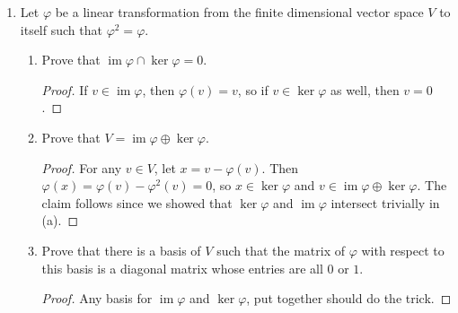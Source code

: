 \documentclass{report}
\newcommand{\R}{\mathbb{R}}
\DeclareMathOperator{\im}{im}
\begin{document}
\begin{enumerate}
\begin{proof}
			If $\varphi|_W$ and $\Tilde{\varphi}$ are nonsingular, then they have inverses $\varphi|^{-1}_W$ and $\Tilde{\varphi}^{-1}$.
			Let $\bar{\varphi}:V\to V$ be defined by $\bar{\varphi}(x+w)=\Tilde{\varphi}^{-1}(x)+\varphi|_W^{-1}(w)$ for any $w\in W$ and $x\in V / W$.
			Then for any $x\in V$, and $w\in W$, 
			$$\bar{\varphi}\circ\varphi (x+w)= \bar{\varphi}(\Tilde{\varphi}(x)+\varphi|_W(x))=x+w$$
			so $\bar{\varphi}$ is an inverse for $\varphi$.
			When $V$ is finite-dimensional, nonsingularity is equivalent to invertibility, so $\varphi^{-1}$ can be split as described above, 
			giving rise to inverses for $\Tilde{\varphi}$ and $\varphi|_W$. However, if $V$ is infinite dimensional, $\varphi$ may not be invertible.
			For example, consider the infinite dimensional vector space $\R[x]$ and the map $\varphi:p(x)\mapsto xp (x)$.
			Observe that $\varphi$ is nonsingular and stabilizes $x\R[x]$. However, in this case $\Tilde{\varphi}:\R\to \R$ is the $0$ map.
		\end{proof}
	\setcounter{enumi}{10}
	\item Let $\varphi$ be a linear transformation from the finite dimensional vector space $V$ to itself such that $\varphi^2=\varphi$.
		\begin{enumerate} [label=(\alph*)]
			\item Prove that $\im \varphi \cap \ker \varphi = 0$.
				\begin{proof}
					If $v\in \im\varphi$, then $\varphi(v)=v$, so if $v\in\ker\varphi$ as well, then $v=0$.
				\end{proof}
			\item Prove that $V=\im \varphi \oplus \ker\varphi$.
				\begin{proof}
					For any $v\in V$, let $x=v-\varphi(v)$. Then $\varphi(x)=\varphi(v)-\varphi^2(v)=0$, so $x\in\ker\varphi$ and $v\in\im\varphi\oplus\ker\varphi$. 
					The claim follows since we showed that $\ker \varphi$ and $\im \varphi$ intersect trivially in (a).
				\end{proof}
			\item Prove that there is a basis of $V$ such that the matrix of $\varphi$ with respect to this basis is a diagonal matrix whose entries are all $0$ or $1$.
				\begin{proof}
					Any basis for $\im\varphi$ and $\ker\varphi$, put together should do the trick.
				\end{proof}
		\end{enumerate}
		

\end{enumerate}
\end{document}
